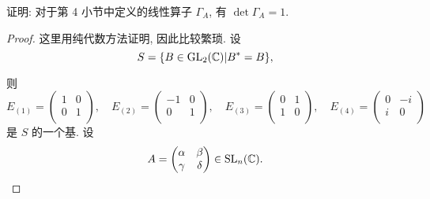 \documentclass[color=black,device=normal,lang=cn,mode=geye]{elegantnote}
\begin{document}
\begin{exercise}%
    证明: 对于第 4 小节中定义的线性算子 $\Gamma_A$, 有 $\det\Gamma_A=1$.
\end{exercise}
\begin{landscape}
    \begin{proof}
        这里用纯代数方法证明, 因此比较繁琐. 设
        \[S=\{B\in\operatorname{GL} _2(\mathbb{C})|B^*=B\},\]
        
        则
        \[E_{(1)}=\begin{pmatrix}
            1 & 0 \\
            0 & 1 \\
        \end{pmatrix},\quad E_{(2)}=\begin{pmatrix}
            -1 & 0 \\
            0 & 1 \\
        \end{pmatrix},\quad E_{(3)}=\begin{pmatrix}
            0 & 1 \\
            1 & 0 \\
        \end{pmatrix},\quad E_{(4)}=\begin{pmatrix}
            0 & -i \\
            i & 0 \\
        \end{pmatrix}\]
        是 $S$ 的一个基. 设
        \[A=\begin{pmatrix}
            \alpha & \beta \\
            \gamma & \delta \\
        \end{pmatrix}\in\operatorname{SL} _n(\mathbb{C}).\]
    

\end{proof}
\end{landscape}
\end{document}
